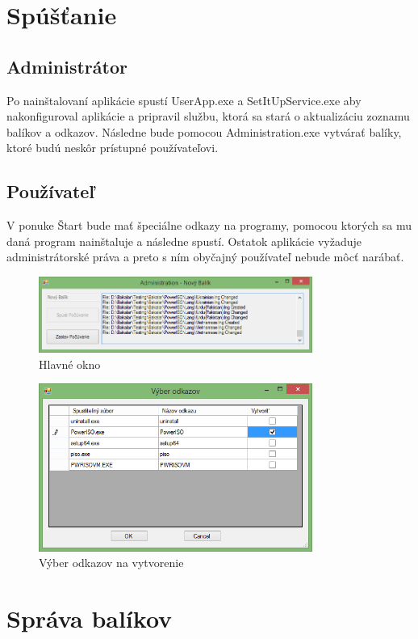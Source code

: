 \section{Spúšťanie}
\subsection{Administrátor}
Po nainštalovaní aplikácie spustí UserApp.exe a SetItUpService.exe aby nakonfiguroval aplikácie a pripravil službu, ktorá sa stará o aktualizáciu zoznamu balíkov a odkazov. Následne bude pomocou Administration.exe vytvárať balíky, ktoré budú neskôr prístupné používateľovi.

\subsection{Používateľ}
V ponuke Štart bude mať špeciálne odkazy na programy, pomocou ktorých sa mu daná program nainštaluje a následne spustí. Ostatok aplikácie vyžaduje administrátorské práva a preto s ním obyčajný používateľ nebude môcť narábať.
\begin{figure}[h]
    \centering
    \includegraphics[width=0.8\textwidth]{hlavne}
    \caption{Hlavné okno}
    \label{fig:hlavne}
\end{figure}
\begin{figure}[h]
    \centering
    \includegraphics[width=0.8\textwidth]{odkazy}
    \caption{Výber odkazov na vytvorenie}
    \label{fig:links}
\end{figure}

\section{Správa balíkov}
